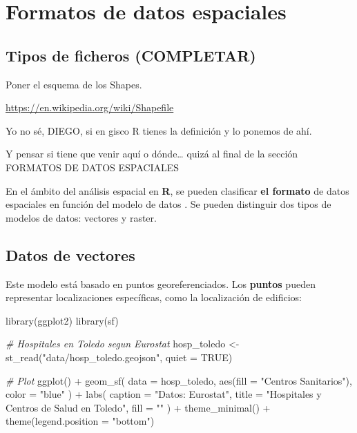 \documentclass[
]{book}
\newenvironment{Shaded}{\begin{snugshade}}{\end{snugshade}}
\newcommand{\AttributeTok}[1]{\textcolor[rgb]{0.77,0.63,0.00}{#1}}
\newcommand{\CommentTok}[1]{\textcolor[rgb]{0.56,0.35,0.01}{\textit{#1}}}
\newcommand{\ConstantTok}[1]{\textcolor[rgb]{0.00,0.00,0.00}{#1}}
\newcommand{\FunctionTok}[1]{\textcolor[rgb]{0.00,0.00,0.00}{#1}}
\newcommand{\NormalTok}[1]{#1}
\newcommand{\OtherTok}[1]{\textcolor[rgb]{0.56,0.35,0.01}{#1}}
\newcommand{\SpecialCharTok}[1]{\textcolor[rgb]{0.00,0.00,0.00}{#1}}
\newcommand{\StringTok}[1]{\textcolor[rgb]{0.31,0.60,0.02}{#1}}
\begin{document}
\hypertarget{formatos}{%
\chapter{Formatos de datos espaciales}\label{formatos}}

\hypertarget{tipos-de-ficheros-completar}{%
\section{Tipos de ficheros (COMPLETAR)}\label{tipos-de-ficheros-completar}}

Poner el esquema de los Shapes.

\url{https://en.wikipedia.org/wiki/Shapefile}

Yo no sé, DIEGO, si en gisco R tienes la definición y lo ponemos de ahí.

Y pensar si tiene que venir aquí o dónde\ldots{} quizá al final de la sección
FORMATOS DE DATOS ESPACIALES

En el ámbito del análisis espacial en \textbf{R}, se pueden clasificar \textbf{el formato}
de datos espaciales en función del modelo de datos \citep{Lovelance_et_al_2019}. Se
pueden distinguir dos tipos de modelos de datos: vectores y raster.

\hypertarget{datos-de-vectores}{%
\section{Datos de vectores}\label{datos-de-vectores}}

Este modelo está basado en puntos georeferenciados. Los \textbf{puntos} pueden
representar localizaciones específicas, como la localización de edificios:

\begin{Shaded}
\begin{Highlighting}[]

\FunctionTok{library}\NormalTok{(ggplot2)}
\FunctionTok{library}\NormalTok{(sf)}


\CommentTok{\# Hospitales en Toledo segun Eurostat}
\NormalTok{hosp\_toledo }\OtherTok{\textless{}{-}} \FunctionTok{st\_read}\NormalTok{(}\StringTok{"data/hosp\_toledo.geojson"}\NormalTok{, }\AttributeTok{quiet =} \ConstantTok{TRUE}\NormalTok{)}

\CommentTok{\# Plot}
\FunctionTok{ggplot}\NormalTok{() }\SpecialCharTok{+}
  \FunctionTok{geom\_sf}\NormalTok{(}
    \AttributeTok{data =}\NormalTok{ hosp\_toledo, }\FunctionTok{aes}\NormalTok{(}\AttributeTok{fill =} \StringTok{"Centros Sanitarios"}\NormalTok{),}
    \AttributeTok{color =} \StringTok{"blue"}
\NormalTok{  ) }\SpecialCharTok{+}
  \FunctionTok{labs}\NormalTok{(}
    \AttributeTok{caption =} \StringTok{"Datos: Eurostat"}\NormalTok{,}
    \AttributeTok{title =} \StringTok{"Hospitales y Centros de Salud en Toledo"}\NormalTok{,}
    \AttributeTok{fill =} \StringTok{""}
\NormalTok{  ) }\SpecialCharTok{+}
  \FunctionTok{theme\_minimal}\NormalTok{() }\SpecialCharTok{+}
  \FunctionTok{theme}\NormalTok{(}\AttributeTok{legend.position =} \StringTok{"bottom"}\NormalTok{)}
\end{Highlighting}
\end{Shaded}
\end{document}
